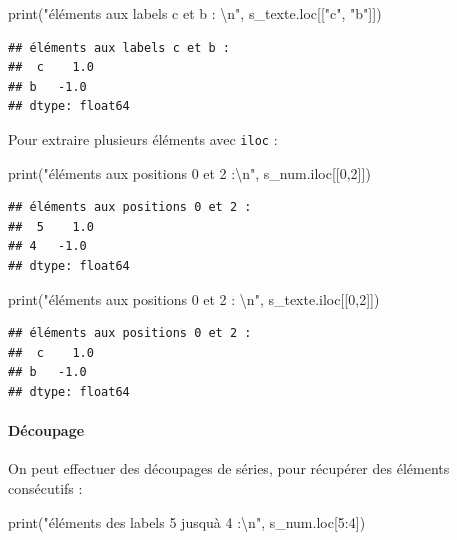 \documentclass[
  12pt,
]{book}
\newenvironment{Shaded}{\begin{snugshade}}{\end{snugshade}}
\newcommand{\BuiltInTok}[1]{#1}
\newcommand{\CharTok}[1]{\textcolor[rgb]{0.31,0.60,0.02}{#1}}
\newcommand{\DecValTok}[1]{\textcolor[rgb]{0.00,0.00,0.81}{#1}}
\newcommand{\NormalTok}[1]{#1}
\newcommand{\StringTok}[1]{\textcolor[rgb]{0.31,0.60,0.02}{#1}}
\numberwithin{equation}{section}
\numberwithin{countremarque}{section}
\begin{document}
\begin{Shaded}
\begin{Highlighting}[]
\BuiltInTok{print}\NormalTok{(}\StringTok{"éléments aux labels c et b : }\CharTok{\textbackslash{}n}\StringTok{"}\NormalTok{, s\_texte.loc[[}\StringTok{"c"}\NormalTok{, }\StringTok{"b"}\NormalTok{]])}
\end{Highlighting}
\end{Shaded}

\begin{lstlisting}
## éléments aux labels c et b : 
##  c    1.0
## b   -1.0
## dtype: float64
\end{lstlisting}

Pour extraire plusieurs éléments avec \texttt{iloc} :

\begin{Shaded}
\begin{Highlighting}[]
\BuiltInTok{print}\NormalTok{(}\StringTok{"éléments aux positions 0 et 2 :}\CharTok{\textbackslash{}n}\StringTok{"}\NormalTok{, s\_num.iloc[[}\DecValTok{0}\NormalTok{,}\DecValTok{2}\NormalTok{]])}
\end{Highlighting}
\end{Shaded}

\begin{lstlisting}
## éléments aux positions 0 et 2 :
##  5    1.0
## 4   -1.0
## dtype: float64
\end{lstlisting}

\begin{Shaded}
\begin{Highlighting}[]
\BuiltInTok{print}\NormalTok{(}\StringTok{"éléments aux positions 0 et 2 : }\CharTok{\textbackslash{}n}\StringTok{"}\NormalTok{, s\_texte.iloc[[}\DecValTok{0}\NormalTok{,}\DecValTok{2}\NormalTok{]])}
\end{Highlighting}
\end{Shaded}

\begin{lstlisting}
## éléments aux positions 0 et 2 : 
##  c    1.0
## b   -1.0
## dtype: float64
\end{lstlisting}

\paragraph{Découpage}\label{decoupage-series}

On peut effectuer des découpages de séries, pour récupérer des éléments consécutifs :

\begin{Shaded}
\begin{Highlighting}[]
\BuiltInTok{print}\NormalTok{(}\StringTok{"éléments des labels 5 jusqu\textquotesingle{}à 4 :}\CharTok{\textbackslash{}n}\StringTok{"}\NormalTok{, s\_num.loc[}\DecValTok{5}\NormalTok{:}\DecValTok{4}\NormalTok{])}
\end{Highlighting}
\end{Shaded}
\end{document}
